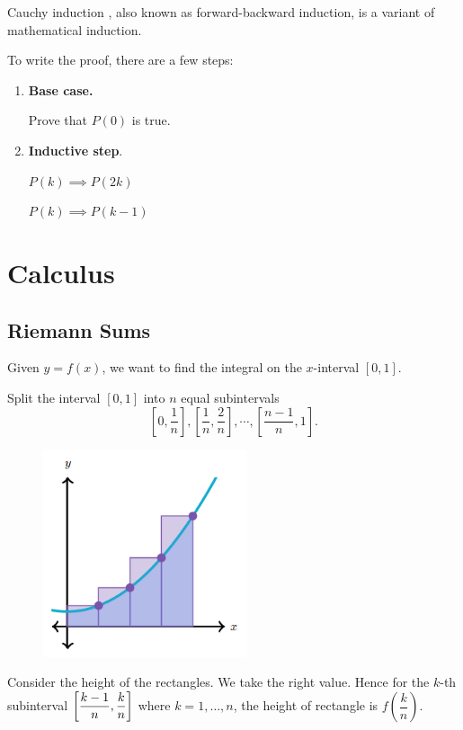 \begin{defn}{Cauchy induction}{}
, also known as forward-backward induction, is a variant of mathematical induction.
\end{defn}

To write the proof, there are a few steps:
\begin{enumerate}
  \item \textbf{Base case.}
  
  Prove that $P(0)$ is true.
  \item \textbf{Inductive step}.
  
  $P(k) \implies P(2k)$
  
  $P(k) \implies P(k-1)$
\end{enumerate}

\chapter{Calculus}
\section{Riemann Sums}
Given $y=f(x)$, we want to find the integral on the $x$-interval $[0,1]$.

Split the interval $[0,1]$ into $n$ equal subintervals \[ \left[0, \frac{1}{n}\right], \left[\frac{1}{n}, \frac{2}{n}\right], \cdots, \left[\frac{n-1}{n}, 1\right]. \]

\begin{figure}[H]
    \centering
    \includegraphics[width=6cm]{images/Riemanns_sums.png}
\end{figure}

Consider the height of the rectangles. We take the right value. Hence for the $k$-th subinterval $\left[\dfrac{k-1}{n}, \dfrac{k}{n}\right]$ where $k=1,\dots,n$, the height of rectangle is $f\left(\dfrac{k}{n}\right)$.\\

